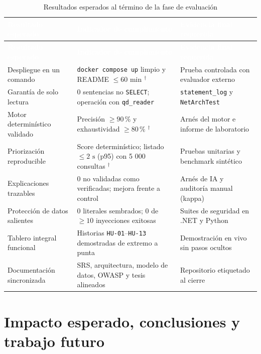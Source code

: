 \documentclass[12pt,a4paper]{article}
\newcommand{\dagsym}{\ensuremath{^{\dagger}}}
\begin{document}
\begingroup
{}
\small
\begin{longtable}{p{} p{} p{}}
\toprule
\rowcolor{utbblue}
\textcolor{white}{\textbf{Resultado esperado}} & \textcolor{white}{\textbf{Indicador de cumplimiento}} & \textcolor{white}{\textbf{Evidencia final requerida}} \\
\midrule
\endfirsthead
\toprule
\rowcolor{utbblue}
\textcolor{white}{\textbf{Resultado esperado}} & \textcolor{white}{\textbf{Indicador de cumplimiento}} & \textcolor{white}{\textbf{Evidencia final requerida}} \\
\midrule
\endhead
\bottomrule
\caption{Resultados esperados al término de la fase de evaluación}
\label{tab:resultados-esperados}
\endlastfoot
Despliegue en un comando & \texttt{docker compose up} limpio y README $\le 60\text{ min}$ \dagsym{} & Prueba controlada con evaluador externo \\
Garantía de solo lectura & 0 sentencias no \texttt{SELECT}; operación con \texttt{qd\_reader} & \texttt{statement\_log} y \texttt{NetArchTest} \\
Motor determinístico validado & Precisión $\ge 90\,\%$ y exhaustividad $\ge 80\,\%$ \dagsym{} & Arnés del motor e informe de laboratorio \\
Priorización reproducible & Score determinístico; listado $\le 2\text{ s}$ (p95) con 5 000 consultas \dagsym{} & Pruebas unitarias y benchmark sintético \\
Explicaciones trazables & 0 no validadas como verificadas; mejora frente a control & Arnés de IA y auditoría manual (kappa) \\
Protección de datos salientes & 0 literales sembrados; 0 de $\ge 10$ inyecciones exitosas & Suites de seguridad en .NET y Python \\
Tablero integral funcional & Historias \texttt{HU-01}--\texttt{HU-13} demostradas de extremo a punta & Demostración en vivo sin pasos ocultos \\
Documentación sincronizada & SRS, arquitectura, modelo de datos, OWASP y tesis alineados & Repositorio etiquetado al cierre \\
\end{longtable}
\endgroup

\section{Impacto esperado, conclusiones y trabajo futuro}
\end{document}
